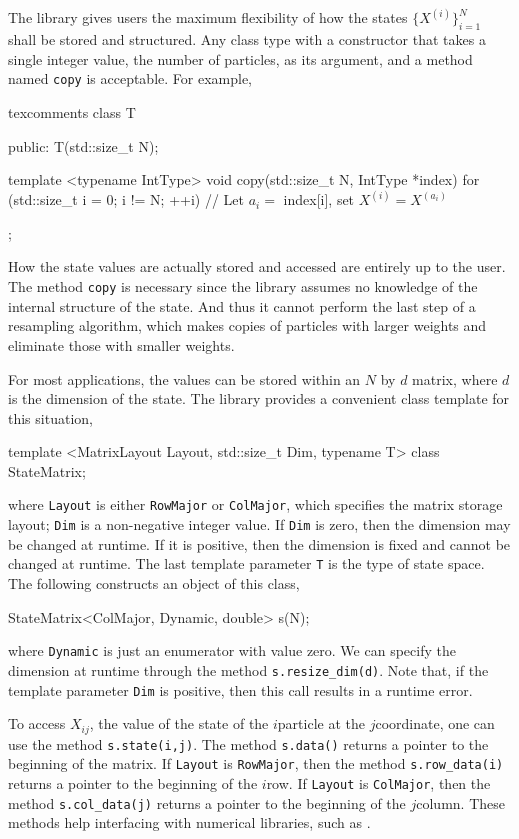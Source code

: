 The library gives users the maximum flexibility of how the states
$\{X^{(i)}\}_{i=1}^N$ shall be stored and structured. Any class type with a
constructor that takes a single integer value, the number of particles, as its
argument, and a method named \verb|copy| is acceptable. For example,
\begin{cppcode*}{texcomments}
  class T
  {
      public:
      T(std::size_t N);

      template <typename IntType>
      void copy(std::size_t N, IntType *index)
      {
          for (std::size_t i = 0; i != N; ++i) {
              // Let $a_i =$ index[i], set $X^{(i)} = X^{(a_i)}$
          }
      }
  };
\end{cppcode*}
How the state values are actually stored and accessed are entirely up to the
user. The method \verb|copy| is necessary since the library assumes no
knowledge of the internal structure of the state. And thus it cannot perform
the last step of a resampling algorithm, which makes copies of particles with
larger weights and eliminate those with smaller weights.

For most applications, the values can be stored within an $N$ by $d$ matrix,
where $d$ is the dimension of the state. The library provides a convenient
class template for this situation,
\begin{cppcode}
  template <MatrixLayout Layout, std::size_t Dim, typename T>
  class StateMatrix;
\end{cppcode}
where \verb|Layout| is either \verb|RowMajor| or \verb|ColMajor|, which
specifies the matrix storage layout; \verb|Dim| is a non-negative integer
value. If \verb|Dim| is zero, then the dimension may be changed at runtime. If
it is positive, then the dimension is fixed and cannot be changed at runtime.
The last template parameter \verb|T| is the \cpp type of state space. The
following constructs an object of this class,
\begin{cppcode}
  StateMatrix<ColMajor, Dynamic, double> s(N);
\end{cppcode}
where \verb|Dynamic| is just an enumerator with value zero. We can specify the
dimension at runtime through the method \verb|s.resize_dim(d)|. Note that, if
the template parameter \verb|Dim| is positive, then this call results in a
runtime error.

To access $X_{ij}$, the value of the state of the $i$\ith particle at the
$j$\ith coordinate, one can use the method \verb|s.state(i,j)|. The method
\verb|s.data()| returns a pointer to the beginning of the matrix. If
\verb|Layout| is \verb|RowMajor|, then the method \verb|s.row_data(i)| returns
a pointer to the beginning of the $i$\ith row. If \verb|Layout| is
\verb|ColMajor|, then the method \verb|s.col_data(j)| returns a pointer to the
beginning of the $j$\ith column. These methods help interfacing with numerical
libraries, such as \blas.

